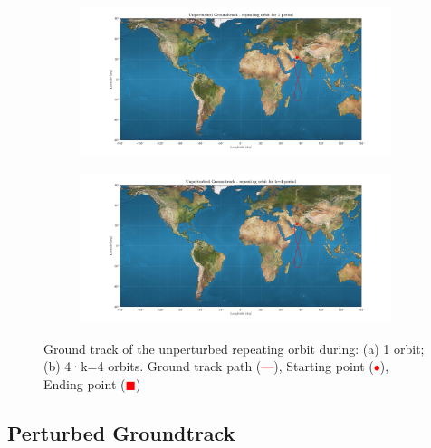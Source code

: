 \documentclass{article}
\newcommand{\reddashedline}{\textcolor{red}{---}}
\begin{document}
\begin{figure}[ht]
	\centering
	\begin{subfigure}[b]{0.45\textwidth}
		\includegraphics[width=\textwidth]{ugro1orb.png}
		\caption{}
		\label{fig:1a}
	\end{subfigure}
	\hfill
	\begin{subfigure}[b]{0.45\textwidth}
		\includegraphics[width=\textwidth]{ugro4orb.png}
		\caption{}
		\label{fig:1b}
	\end{subfigure}
	
	\caption{Ground track of the unperturbed repeating orbit during: (a) 1 orbit; (b) 4·k=4 orbits. Ground track path (\reddashedline), Starting point (\textcolor{red}{$\bullet$}), Ending point (\textcolor{red}{$\blacksquare$})
	}
\end{figure}

\subsection{Perturbed Groundtrack}

	






	

	
\end{document}
